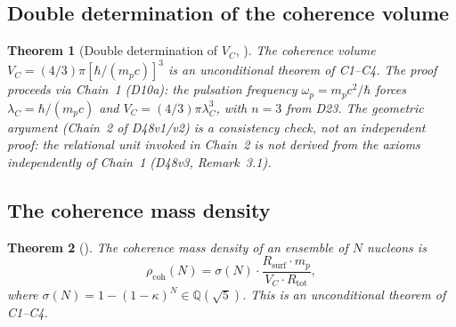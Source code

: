 \documentclass[11pt,a4paper]{article}
\theoremstyle{plain}
\newtheorem{theorem}{Theorem}[section]
\theoremstyle{definition}
\theoremstyle{remark}
\newcommand{\Rsurf}{R_{\mathrm{surf}}}
\newcommand{\Rtot}{R_{\mathrm{tot}}}
\newcommand{\sigmaN}{\sigma(N)}
\newcommand{\rhocoh}{\rho_{\mathrm{coh}}}
\begin{document}
\subsection{Double determination of the coherence volume}
\label{subsec:VC}
\begin{theorem}[Double determination of $V_C$, \cite{D48}]
\label{thm:VC}
The coherence volume $V_C = (4/3)\pi[\hbar/(m_p c)]^3$ is an unconditional theorem of C1--C4. The proof proceeds via Chain~1 (D10a): the pulsation frequency $\omega_p = m_p c^2/\hbar$ forces $\lambda_C = \hbar/(m_p c)$ and $V_C = (4/3)\pi\lambda_C^3$, with $n=3$ from D23. The geometric argument (Chain~2 of D48v1/v2) is a consistency check, not an independent proof: the relational unit invoked in Chain~2 is not derived from the axioms independently of Chain~1 (D48v3, Remark~3.1).
\end{theorem}

\subsection{The coherence mass density}
\label{subsec:rhocoh}
\begin{theorem}[\cite{D48}]
\label{thm:rhocoh}
The coherence mass density of an ensemble of $N$ nucleons is
\begin{equation}
\rhocoh(N) = \sigmaN \cdot \frac{\Rsurf \cdot m_p}{V_C \cdot \Rtot},
\end{equation}
where $\sigmaN = 1-(1-\kappa)^N \in \mathbb{Q}(\sqrt{5})$. This is an unconditional theorem of C1--C4.
\end{theorem}
\end{document}
